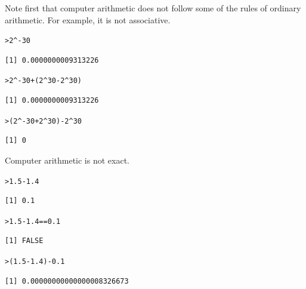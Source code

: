 \documentclass[12pt,oneside]{book}\usepackage[]{graphicx}\usepackage[]{color}
\makeatletter
\newcommand{\hlnum}[1]{\textcolor[rgb]{0.686,0.059,0.569}{#1}}%
\newcommand{\hlopt}[1]{\textcolor[rgb]{0,0,0}{#1}}%
\newcommand{\hlstd}[1]{\textcolor[rgb]{0.345,0.345,0.345}{#1}}%
\newenvironment{kframe}{%
 \def\at@end@of@kframe{}%
 \ifinner\ifhmode%
  \def\at@end@of@kframe{\end{minipage}}%
  \begin{minipage}{\columnwidth}%
 \fi\fi%
 \def\FrameCommand##1{\hskip\@totalleftmargin \hskip-\fboxsep
 \colorbox{shadecolor}{##1}\hskip-\fboxsep
     \hskip-\linewidth \hskip-\@totalleftmargin \hskip\columnwidth}%
 \MakeFramed {\advance\hsize-\width
   \@totalleftmargin\z@ \linewidth\hsize
   \@setminipage}}%
 {\par\unskip\endMakeFramed%
 \at@end@of@kframe}
\newenvironment{knitrout}{}{} %
\makeatother
\begin{document}
Note first that computer arithmetic does not follow some of the rules of ordinary arithmetic. For example, it is not associative.
\begin{knitrout}
\color{fgcolor}\begin{kframe}
\begin{alltt}
\hlstd{> }\hlnum{2}\hlopt{^-}\hlnum{30}
\end{alltt}
\begin{verbatim}
[1] 0.0000000009313226
\end{verbatim}
\begin{alltt}
\hlstd{> }\hlnum{2}\hlopt{^-}\hlnum{30} \hlopt{+} \hlstd{(}\hlnum{2}\hlopt{^}\hlnum{30} \hlopt{-} \hlnum{2}\hlopt{^}\hlnum{30}\hlstd{)}
\end{alltt}
\begin{verbatim}
[1] 0.0000000009313226
\end{verbatim}
\begin{alltt}
\hlstd{> }\hlstd{(}\hlnum{2}\hlopt{^-}\hlnum{30} \hlopt{+} \hlnum{2}\hlopt{^}\hlnum{30}\hlstd{)} \hlopt{-} \hlnum{2}\hlopt{^}\hlnum{30}
\end{alltt}
\begin{verbatim}
[1] 0
\end{verbatim}
\end{kframe}
\end{knitrout}
Computer arithmetic is not exact.
\begin{knitrout}
\color{fgcolor}\begin{kframe}
\begin{alltt}
\hlstd{> }\hlnum{1.5} \hlopt{-} \hlnum{1.4}
\end{alltt}
\begin{verbatim}
[1] 0.1
\end{verbatim}
\begin{alltt}
\hlstd{> }\hlnum{1.5} \hlopt{-} \hlnum{1.4} \hlopt{==} \hlnum{0.1}
\end{alltt}
\begin{verbatim}
[1] FALSE
\end{verbatim}
\begin{alltt}
\hlstd{> }\hlstd{(}\hlnum{1.5} \hlopt{-} \hlnum{1.4}\hlstd{)} \hlopt{-} \hlnum{0.1}
\end{alltt}
\begin{verbatim}
[1] 0.00000000000000008326673
\end{verbatim}
\end{kframe}
\end{knitrout}
\end{document}
